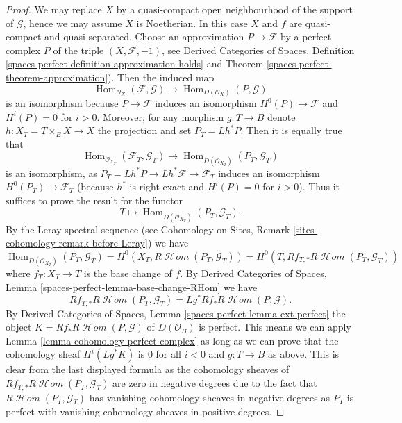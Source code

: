 \documentclass{stacks-project}
\theoremstyle{plain}
\theoremstyle{definition}
\theoremstyle{remark}
\numberwithin{equation}{subsection}
\def\Hom{\mathop{\mathrm{Hom}}\nolimits}
\def\SheafHom{\mathop{\mathcal{H}\!\mathit{om}}\nolimits}
\begin{document}
\begin{proof}
We may replace $X$ by a quasi-compact open neighbourhood of
the support of $\mathcal{G}$, hence we may assume $X$ is Noetherian.
In this case $X$ and $f$ are quasi-compact and quasi-separated.
Choose an approximation $P \to \mathcal{F}$ by a perfect complex $P$ of
the triple $(X, \mathcal{F}, -1)$, see
Derived Categories of Spaces, Definition
\ref{spaces-perfect-definition-approximation-holds} and
Theorem \ref{spaces-perfect-theorem-approximation}).
Then the induced map
$$
\Hom_{\mathcal{O}_X}(\mathcal{F}, \mathcal{G})
\longrightarrow
\Hom_{D(\mathcal{O}_X)}(P, \mathcal{G})
$$
is an isomorphism because $P \to \mathcal{F}$ induces an isomorphism
$H^0(P) \to \mathcal{F}$ and $H^i(P) = 0$ for $i > 0$.
Moreover, for any morphism $g : T \to B$
denote $h : X_T = T \times_B X \to X$ the projection and set
$P_T = Lh^*P$. Then it is equally true that
$$
\Hom_{\mathcal{O}_{X_T}}(\mathcal{F}_T, \mathcal{G}_T)
\longrightarrow
\Hom_{D(\mathcal{O}_{X_T})}(P_T, \mathcal{G}_T)
$$
is an isomorphism, as $P_T = Lh^*P \to Lh^*\mathcal{F} \to \mathcal{F}_T$
induces an isomorphism $H^0(P_T) \to \mathcal{F}_T$ (because $h^*$ is
right exact and $H^i(P) = 0$ for $i > 0$). Thus it suffices to prove the
result for the functor
$$
T \longmapsto \Hom_{D(\mathcal{O}_{X_T})}(P_T, \mathcal{G}_T).
$$
By the Leray spectral sequence (see Cohomology on Sites, Remark
\ref{sites-cohomology-remark-before-Leray}) we have
$$
\Hom_{D(\mathcal{O}_{X_T})}(P_T, \mathcal{G}_T) =
H^0(X_T, R\SheafHom(P_T, \mathcal{G}_T)) =
H^0(T, Rf_{T, *}R\SheafHom(P_T, \mathcal{G}_T))
$$
where $f_T : X_T \to T$ is the base change of $f$. By
Derived Categories of Spaces, Lemma
\ref{spaces-perfect-lemma-base-change-RHom}
we have
$$
Rf_{T, *}R\SheafHom(P_T, \mathcal{G}_T) = Lg^*Rf_*R\SheafHom(P, \mathcal{G}).
$$
By
Derived Categories of Spaces, Lemma
\ref{spaces-perfect-lemma-ext-perfect}
the object $K = Rf_*R\SheafHom(P, \mathcal{G})$ of $D(\mathcal{O}_B)$
is perfect. This means we can apply
Lemma \ref{lemma-cohomology-perfect-complex}
as long as we can prove that the cohomology sheaf
$H^i(Lg^*K)$ is $0$ for all $i < 0$ and $g : T \to B$ as above.
This is clear from the last displayed formula as
the cohomology sheaves of
$Rf_{T, *}R\SheafHom(P_T, \mathcal{G}_T)$
are zero in negative degrees
due to the fact that $R\SheafHom(P_T, \mathcal{G}_T)$ has vanishing
cohomology sheaves in negative degrees as $P_T$ is perfect with
vanishing cohomology sheaves in positive degrees.
\end{proof}
\end{document}
